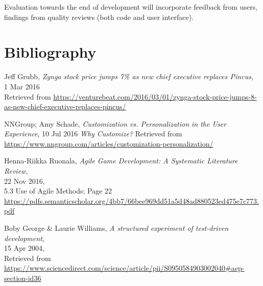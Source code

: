 \documentclass[11pt]{article}
\begin{document}
{Evaluation towards the end of development will incorporate feedback from users, findings from quality reviews (both code and user interface). 




\newpage
\section*{Bibliography}

\begin{thebibliography}{9}




\begin{flushleft}
	Jeff Grubb,
	\textit{Zynga stock price jumps 7\% as new chief executive replaces Pincus}, \\
	1 Mar 2016 \\
	Retrieved from \url{https://venturebeat.com/2016/03/01/zynga-stock-price-jumps-8-as-new-chief-executive-replaces-pincus/}
\end{flushleft}

\begin{flushleft}
	NNGroup; Amy Schade,
	\textit{Customization vs. Personalization in the User Experience},
	10 Jul 2016
	\textit{Why Customize?}	
	Retrieved from \url{https://www.nngroup.com/articles/customization-personalization/}
\end{flushleft}


\begin{flushleft}
	Henna-Riikka Ruonala,
	\textit{Agile Game Development: A Systematic Literature Review}, \\
	22 Nov 2016, \\
	5.3 Use of Agile Methods; Page 22 \\
	\url{https://pdfs.semanticscholar.org/4bb7/66bee969dd51a5d48ad880523ed475e7c773.pdf}
\end{flushleft}

\begin{flushleft}
	Boby George \& Laurie Williams, 
	\textit{A structured experiment of test-driven development}, \\
	15 Apr 2004, \\
	Retrieved from \url{https://www.sciencedirect.com/science/article/pii/S0950584903002040#aep-section-id36}
\end{flushleft}
	




\end{thebibliography}}
\end{document}
